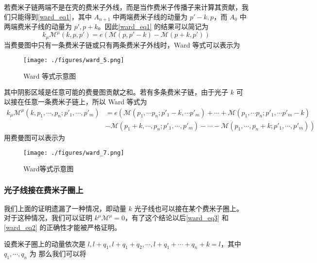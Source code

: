 若费米子链两端不是在壳的费米子外线，而是当作费米子传播子来计算其贡献，我们只能得到\autoref{ward_eq1}，其中 $A_{n+1}$ 中两端费米子线的动量为 $p'-k,p$，而 $A_{0}$ 中两端费米子线的动量为 $p',p+k$。因此\autoref{ward_eq1} 的结果可以简记为
\begin{equation}\label{ward_eq3}
k_\mu\mathcal{M}^\mu(k,p,p') = e(\mathcal{M}(p,p'-k)-\mathcal{M}(p+k,p'))
\end{equation}
当费曼图中只有一条费米子链或只有两条费米子外线时，Ward 等式可以表示为
\begin{figure}[ht]
\centering
\texttt{[image: ./figures/ward\_5.png]}
\caption{Ward 等式示意图} \label{ward_fig5}
\end{figure}
其中阴影区域是任意可能的费曼图贡献之和。若有多条费米子链，由于光子 $k$ 可以接在任意一条费米子链上，所以 Ward 等式为
\begin{equation}\label{ward_eq2}
\begin{aligned}
k_\mu\mathcal{M}^\mu(k,p_1,\cdots,p_n;p'_1,\cdots,p'_m)
&= e\left(
\mathcal{M}(p_1,\cdots p_n;p'_1-k,\cdots p'_m)+\cdots+\mathcal{M}(p_1,\cdots p_n;p'_1,\cdots p'_m-k)
\right.
\\
&\left.-\mathcal{M}(p_1+k,\cdots,p_n;p'_1,\cdots,p'_m)-\cdots-\mathcal{M}(p_1,\cdots,p_n+k;p'_1,\cdots,p'_m)
\right)
\end{aligned}
\end{equation}
用费曼图可以表示为
\begin{figure}[ht]
\centering
\texttt{[image: ./figures/ward\_7.png]}
\caption{Ward等式示意图} \label{ward_fig7}
\end{figure}
\subsubsection{光子线接在费米子圈上}
我们上面的证明遗漏了一种情况，即动量 $k$ 光子线也可以接在某个费米子圈上。对于这种情况，我们可以证明 $k^\mu \mathcal{M}^\mu=0$，有了这个结论以后\autoref{ward_eq3} 和\autoref{ward_eq2} 的正确性才能被严格证明。

设费米子圈上的动量依次是 $l,l+q_1,l+q_1+q_2,\cdots,l+q_1+\cdots+q_n+k=l$，其中 $q_1,\cdots,q_n$ 为 那么我们可以将 $$

